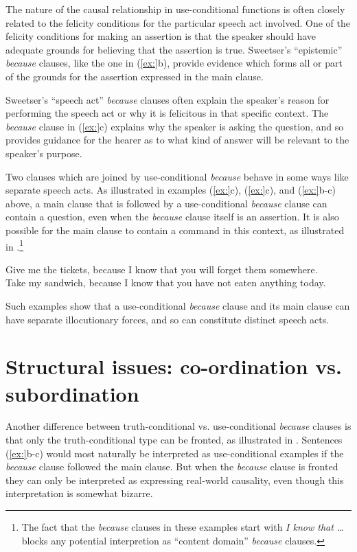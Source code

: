 The nature of the causal relationship in use-conditional functions is often closely related to the felicity conditions for the particular speech act involved. One of the felicity conditions for making an assertion is that the speaker should have adequate grounds for believing that the assertion is true. Sweetser’s “epistemic” \textit{because} clauses, like the one in (\ref{ex:}b), provide evidence which forms all or part of the grounds for the assertion expressed in the main clause.



Sweetser’s “speech act” \textit{because} clauses often explain the speaker’s reason for performing the speech act or why it is felicitous in that specific context. The \textit{because} clause in (\ref{ex:}c) explains why the speaker is asking the question, and so provides guidance for the hearer as to what kind of answer will be relevant to the speaker’s purpose.



Two clauses which are joined by use-conditional \textit{because} behave in some ways like separate speech acts. As illustrated in examples (\ref{ex:}c), (\ref{ex:}c), and (\ref{ex:}b-c) above, a main clause that is followed by a use-conditional \textit{because} clause can contain a question, even when the \textit{because} clause itself is an assertion. It is also possible for the main clause to contain a command in this context, as illustrated in .\footnote{The fact that the \textit{because} clauses in these examples start with \textit{I know that …} blocks any potential interpretion as “content domain” \textit{because} clauses.}


\ea
\ea Give me the tickets, because I know that you will forget them somewhere.\\
\ex Take my sandwich, because I know that you have not eaten anything today.
                       \z
\z


Such examples show that a use-conditional \textit{because} clause and its main clause can have separate illocutionary forces, and so can constitute distinct speech acts.


\section{Structural issues: co-ordination vs. subordination}\label{sec:} %

Another difference between truth-conditional vs. use-conditional \textit{because} clauses is that only the truth-conditional type can be fronted, as illustrated in . Sentences (\ref{ex:}b-c) would most naturally be interpreted as use-conditional examples if the \textit{because} clause followed the main clause. But when the \textit{because} clause is fronted they can only be interpreted as expressing real-world causality, even though this interpretation is somewhat bizarre.


